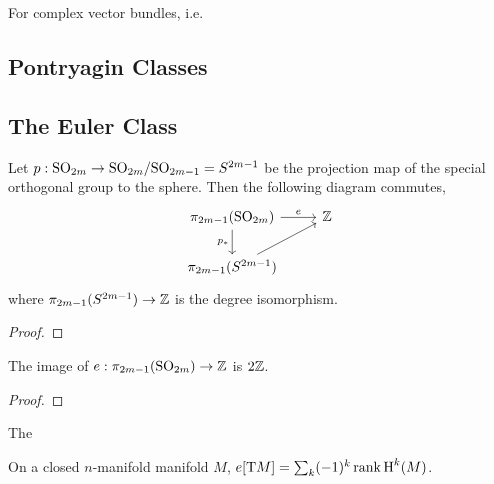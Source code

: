\begin{remark}

\end{remark}

For complex vector bundles, i.e. 

\subsection{Pontryagin Classes}\label{sec:pontryagin-classes}

\subsection{The Euler Class}\label{sec:euler-class}

\begin{theorem}\label{thm:euler-number-of-vector-bundle-over-sphere}
	Let $p : \mathrm{SO}_{2m} \to \mathrm{SO}_{2m}/\mathrm{SO}_{2m-1}= S^{2m-1}$ be the projection map of the special orthogonal group to the sphere. Then the following diagram commutes,
	\[\begin{tikzcd}
			{\pi_{2m-1}(\SO_{2m})} & \Z \\
			{\pi_{2m-1}(S^{2m-1})}
			\arrow["e", from=1-1, to=1-2]
			\arrow["{p_*}"', from=1-1, to=2-1]
			\arrow[from=2-1, to=1-2]
		\end{tikzcd}\]
	where $\pi_{2m-1}(S^{2m-1})\to \mathbb{Z}$ is the degree isomorphism.
\end{theorem}
\begin{proof}
\end{proof}

\begin{corollary}\label{cor:expressible-euler-numbers-spheres}
	The image of $e : \pi_{2m-1}(\mathrm{SO}_{2m})\to\mathbb{Z}$ is $2\mathbb{Z}$.
\end{corollary}
\begin{proof}
\end{proof}


\begin{definition}\label{def:euler-class}
	The 
\end{definition}

\begin{proposition}
	On a closed $n$-manifold manifold $M$, $e[\mathrm{T} M]=\sum_k (-1)^k \operatorname{rank} \operatorname{H}^k(M)$.
\end{proposition}

